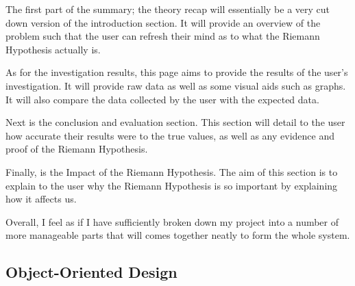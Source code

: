 \documentclass[12pt]{article}
\begin{document}
The first part of the summary; the theory recap will essentially be a very cut down version of the introduction section. It will provide an overview of the problem such that the user can refresh their mind as to what the Riemann Hypothesis actually is.

As for the investigation results, this page aims to provide the results of the user's investigation. It will provide raw data as well as some visual aids such as graphs. It will also compare the data collected by the user with the expected data.

Next is the conclusion and evaluation section. This section will detail to the user how accurate their results were to the true values, as well as any evidence and proof of the Riemann Hypothesis.

Finally, is the Impact of the Riemann Hypothesis. The aim of this section is to explain to the user why the Riemann Hypothesis is so important by explaining how it affects us.


Overall, I feel as if I have sufficiently broken down my project into a number of more manageable parts that will comes together neatly to form the whole system.



\clearpage
\subsection{Object-Oriented Design}
\end{document}
